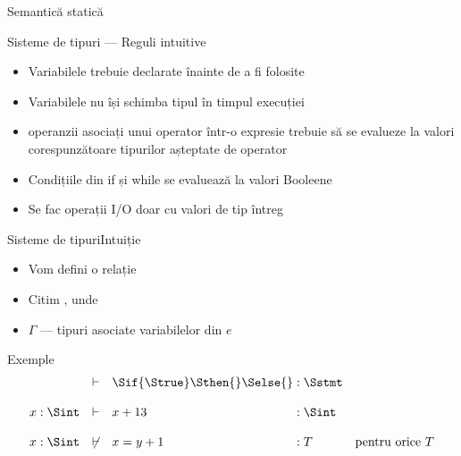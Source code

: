 \documentclass[xcolor=pdftex,romanian,colorlinks]{beamer}
\begin{document}
\begin{section}{Semantică statică}
    \begin{frame}{Sisteme de tipuri --- Reguli intuitive}
      \begin{itemize}
        \item Variabilele trebuie declarate înainte de a fi folosite
        \item Variabilele nu își schimba tipul în timpul execuției
        \item operanzii asociați unui operator într-o expresie trebuie să
          se evalueze la valori corespunzătoare tipurilor așteptate de operator
        \item Condițiile din if și while se evaluează la valori Booleene
        \item Se fac operații I/O doar cu valori de tip întreg
      \end{itemize}
    \end{frame}

  \begin{frame}{Sisteme de tipuri}{Intuiție}
    \begin{itemize}
    \item Vom defini o relație 
    \item Citim , unde
    \item $\Gamma$ — tipuri asociate variabilelor din $e$
    \end{itemize}

    \begin{block}{Exemple}
    \[\begin{array}{lll@{\;:\;}ll}
    &\vdash& \Sif {\Strue} \Sthen \{\} \Selse \{\} & \Sstmt
    \\\\
    x:\Sint&\vdash& x + 13 & \Sint
    \\\\
    x:\Sint&\not\vdash&x = y +1 &T&\mbox{pentru orice } T
    \end{array}\]
    \end{block}
    \end{frame}


\end{section}
\end{document}
